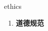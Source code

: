 
\begin{frame}
{\huge ethics}
\begin{center}
\begin{enumerate}\Large
  \item \textbf{道德规范}
\end{enumerate}
\end{center}
\end{frame}
